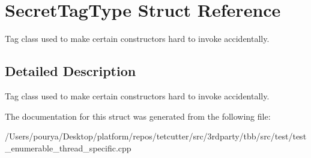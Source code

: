 \hypertarget{structSecretTagType}{}\section{Secret\+Tag\+Type Struct Reference}
\label{structSecretTagType}


Tag class used to make certain constructors hard to invoke accidentally.  




\subsection{Detailed Description}
Tag class used to make certain constructors hard to invoke accidentally. 

The documentation for this struct was generated from the following file\+:\begin{DoxyCompactItemize}
\item 
/\+Users/pourya/\+Desktop/platform/repos/tetcutter/src/3rdparty/tbb/src/test/test\+\_\+enumerable\+\_\+thread\+\_\+specific.\+cpp\end{DoxyCompactItemize}

